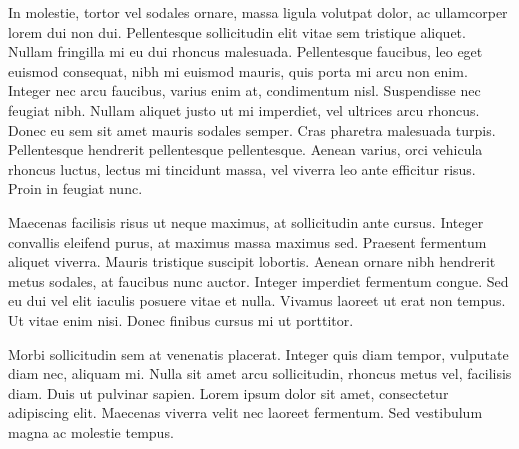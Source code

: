 In molestie, tortor vel sodales ornare, massa ligula volutpat dolor, ac ullamcorper lorem dui non dui. Pellentesque sollicitudin elit vitae sem tristique aliquet. Nullam fringilla mi eu dui rhoncus malesuada. Pellentesque faucibus, leo eget euismod consequat, nibh mi euismod mauris, quis porta mi arcu non enim. Integer nec arcu faucibus, varius enim at, condimentum nisl. Suspendisse nec feugiat nibh. Nullam aliquet justo ut mi imperdiet, vel ultrices arcu rhoncus. Donec eu sem sit amet mauris sodales semper. Cras pharetra malesuada turpis. Pellentesque hendrerit pellentesque pellentesque. Aenean varius, orci vehicula rhoncus luctus, lectus mi tincidunt massa, vel viverra leo ante efficitur risus. Proin in feugiat nunc.

Maecenas facilisis risus ut neque maximus, at sollicitudin ante cursus. Integer convallis eleifend purus, at maximus massa maximus sed. Praesent fermentum aliquet viverra. Mauris tristique suscipit lobortis. Aenean ornare nibh hendrerit metus sodales, at faucibus nunc auctor. Integer imperdiet fermentum congue. Sed eu dui vel elit iaculis posuere vitae et nulla. Vivamus laoreet ut erat non tempus. Ut vitae enim nisi. Donec finibus cursus mi ut porttitor.

Morbi sollicitudin sem at venenatis placerat. Integer quis diam tempor, vulputate diam nec, aliquam mi. Nulla sit amet arcu sollicitudin, rhoncus metus vel, facilisis diam. Duis ut pulvinar sapien. Lorem ipsum dolor sit amet, consectetur adipiscing elit. Maecenas viverra velit nec laoreet fermentum. Sed vestibulum magna ac molestie tempus. 